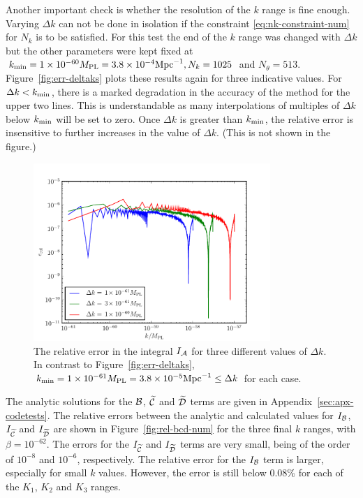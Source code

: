 Another important check is whether the resolution of the $k$ range is
fine enough. Varying $\Delta k$ can not be done in isolation if the
constraint \eqref{eq:nk-constraint-num} for $N_k$ is to
be satisfied. For this test the end of the $k$ range was changed with $\Delta k$
but the other parameters were kept fixed at $k_{\mathrm{min}}=1\times 10^{-60}M_{\mathrm{PL}}=3.8\times 10^{-4}\mathrm{Mpc}^{-1},
N_k = 1025$ and $N_\theta=513$. Figure~\ref{fig:err-deltaks} plots
these results again for three indicative values.  For $\Delta
k<k_{\mathrm{min}}$, there is a marked degradation in
the accuracy of the method for the upper two lines. This is understandable as many
interpolations of multiples of $\Delta k$ below $\kmin$ will be set to
zero. Once $\Delta k$ is greater than $\kmin$, the relative error is
insensitive to further increases in the value of $\Delta k$. (This is not shown in
the figure.)


\begin{figure}[htbp]
 \centering
 \includegraphics[width=0.8\textwidth]{numerical/graphs/err_deltak_kmin-large.pdf}
 \caption[Relative Error in $I_\A$ with fixed $\kmin$]{The 
relative error in the integral $I_\A$ for three different values of $\Delta k$. In
contrast to Figure~\ref{fig:err-deltaks}, $k_{\mathrm{min}}=1\times 10^{-61}M_{\mathrm{PL}}=3.8\times 10^{-5}\mathrm{Mpc}^{-1} \le
\Delta k$ for each case.}
 \label{fig:err-deltak-kmin}
\end{figure}
 
The analytic solutions for the $\mathcal{B}$, $\widetilde{\mathcal{C}}$ and $\widetilde{\mathcal{D}}$ terms are given in
Appendix~\ref{sec:apx-codetests}. 
The relative errors between the analytic and calculated values for $I_{\mathcal{B}}$,
$I_{\widetilde{\mathcal{C}}}$ and $I_{\widetilde{\mathcal{D}}}$ are shown in Figure~\ref{fig:rel-bcd-num} for the
three final $k$ ranges, with $\beta=10^{-62}$. The errors
for the $I_{\widetilde{\mathcal{C}}}$ and $I_{\widetilde{\mathcal{D}}}$ terms are very small, being of the order of
$10^{-8}$ and $10^{-6}$, respectively. The relative error for the $I_{\mathcal{B}}$ term is
larger, especially for small $k$ values. However, the error is still below $0.08\%$
for each of the $K_1$, $K_2$ and $K_3$ ranges.


